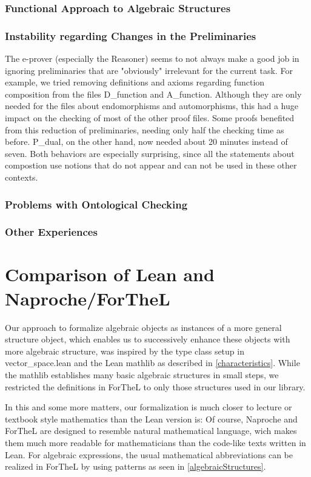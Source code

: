 \documentclass[11pt]{article}
\begin{document}
\subsubsection{Functional Approach to Algebraic Structures} \label{functionalapproach}

\subsubsection{Instability regarding Changes in the Preliminaries} \label{instabilites}
The e-prover (especially the Reasoner) seems to not always make a good job in ignoring preliminaries that are "obviously" irrelevant for the current task.
For example, we tried removing definitions and axioms regarding function composition from the files D\_function and A\_function. Although they are only needed for the files about endomorphisms and automorphisms, this had a huge impact on the checking of most of the other proof files.
Some proofs benefited from this reduction of preliminaries, needing only half the checking time as before.
P\_dual, on the other hand, now needed about 20 minutes instead of seven.
Both behaviors are especially surprising, since all the statements about compostion use notions that do not appear and can not be used in these other contexts.

\subsubsection{Problems with Ontological Checking}

\subsubsection{Other Experiences}


\newpage
\section{Comparison of Lean and Naproche/ForTheL}
Our approach to formalize algebraic objects as instances of a more general {\ftl structure} object, which enables us to successively enhance these objects with more algebraic structure, was inspired by the type class setup in vector\_space.lean and the Lean mathlib as described in \ref{characteristics}.
While the mathlib establishes many basic algebraic structures in small steps, we restricted the definitions in ForTheL to only those structures used in our library.

In this and some more matters, our formalization is much closer to lecture or textbook style mathematics than the Lean version is:
Of course, Naproche and ForTheL are designed to resemble natural mathematical language, wich makes them much more readable for mathematicians than the code-like texts written in Lean. For algebraic expressions, the usual mathematical abbreviations can be realized in ForTheL by using patterns as seen in \ref{algebraicStructures}.
\end{document}
